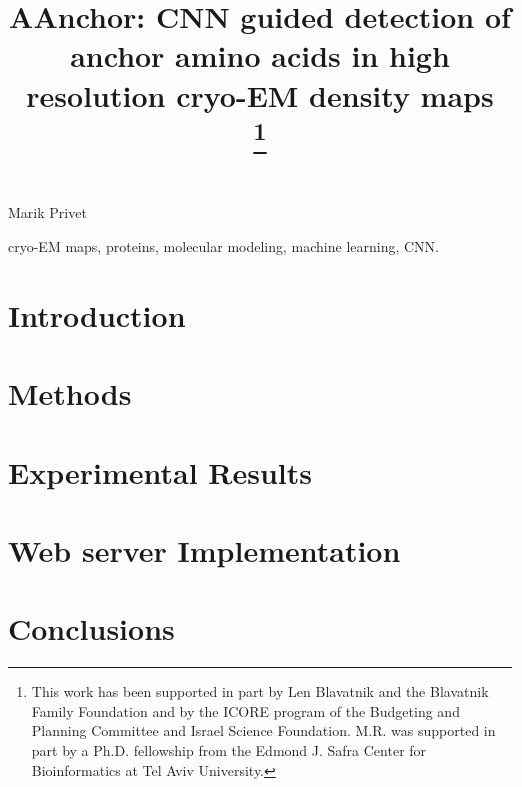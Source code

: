 \documentclass[conference]{IEEEtran}
\begin{document}
\title{AAnchor: CNN guided detection of anchor amino acids in high resolution cryo-EM density maps \\
\thanks{This work has been supported in part by Len Blavatnik and the Blavatnik
Family Foundation and by the ICORE program of the Budgeting and Planning
Committee and Israel Science Foundation. M.R. was supported in part by a Ph.D. fellowship from the Edmond J. Safra Center for Bioinformatics at Tel Aviv University.}
}
\author{
\and
{}
}
\newpage
\maketitle
{}


Marik Privet

\begin{abstract}

\end{abstract}

\begin{IEEEkeywords}
cryo-EM maps, proteins, molecular modeling, machine learning, CNN.
\end{IEEEkeywords}
\section{Introduction}

\section{Methods}

\section{Experimental Results}

\section{Web server Implementation}

\section{Conclusions}


\end{document}

